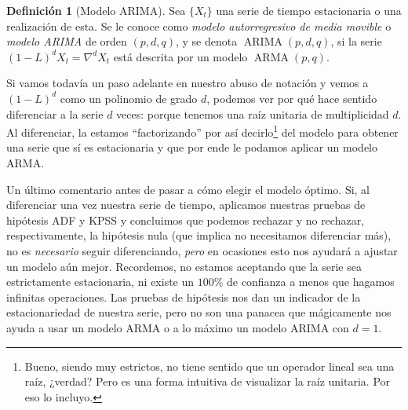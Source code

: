 \documentclass[11pt,letterpaper]{article}
\newcommand{\ARMA}{\ensuremath{\operatorname{ARMA}}}
\newcommand{\ARIMA}{\ensuremath{\operatorname{ARIMA}}}
\theoremstyle{definition}
\newtheorem{definition}{Definición}[section]
\theoremstyle{theorem}
\theoremstyle{remark}
\begin{document}
	\begin{definition}[Modelo ARIMA]
		Sea \(\{X_t\}\) una serie de tiempo estacionaria o una realización de esta. Se le conoce como \textit{modelo autorregresivo de media movible} o \textit{modelo ARIMA} de orden \((p,d,q)\), y se denota \(\ARIMA(p,d,q)\), si la serie \((1-L)^dX_t=\nabla^dX_t\) está descrita por un modelo \(\ARMA(p,q)\).
	\end{definition}
	Si vamos todavía un paso adelante en nuestro abuso de notación y vemos a \((1-L)^d\) como un polinomio de grado \(d\), podemos ver por qué hace sentido diferenciar a la serie \(d\) veces: porque tenemos una raíz unitaria de multiplicidad \(d\). Al diferenciar, la estamos ``factorizando'' por así decirlo\footnote{Bueno, siendo muy estrictos, no tiene sentido que un operador lineal sea una raíz, ¿verdad? Pero es una forma intuitiva de visualizar la raíz unitaria. Por eso lo incluyo.} del modelo para obtener una serie que sí es estacionaria y que por ende le podamos aplicar un modelo ARMA. \par
	Un último comentario antes de pasar a cómo elegir el modelo óptimo. Si, al diferenciar una vez nuestra serie de tiempo, aplicamos nuestras pruebas de hipótesis ADF y KPSS y concluimos que podemos rechazar y no rechazar, respectivamente, la hipótesis nula (que implica no necesitamos diferenciar más), no es \textit{necesario} seguir diferenciando, \textit{pero} en ocasiones esto nos ayudará a ajustar un modelo aún mejor. Recordemos, no estamos aceptando que la serie sea estrictamente estacionaria, ni existe un \(100\%\) de confianza a menos que hagamos infinitas operaciones. Las pruebas de hipótesis nos dan un indicador de la estacionariedad de nuestra serie, pero no son una panacea que mágicamente nos ayuda a usar un modelo ARMA o a lo máximo un modelo ARIMA con \(d=1\).
\end{document}

